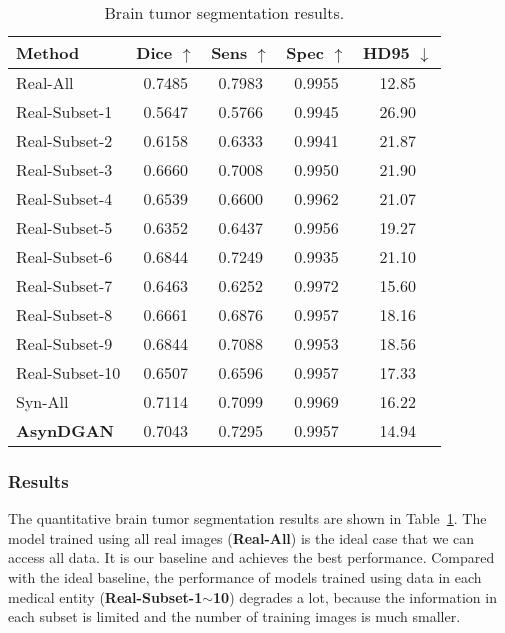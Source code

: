 \begin{table}[t]
	\begin{center}
		\begin{tabular}{lcccc}
			\toprule
			Method & Dice $\uparrow$ & Sens $\uparrow$  & Spec $\uparrow$  & HD95 $\downarrow$ \\
			\midrule
			Real-All & 0.7485 & 0.7983	& 0.9955 & 12.85 \\ \midrule
			Real-Subset-1 & 0.5647 &	0.5766 &	0.9945 &	26.90 \\
			Real-Subset-2 & 0.6158 &	0.6333 &	0.9941 &	21.87 \\
			Real-Subset-3 & 0.6660 &	0.7008 &	0.9950 &	21.90 \\
			Real-Subset-4 & 0.6539 &	0.6600 &	0.9962 &	21.07 \\
			Real-Subset-5 & 0.6352 &	0.6437 &	0.9956 &	19.27 \\
			Real-Subset-6 & 0.6844 &	0.7249 &	0.9935 &	21.10 \\
			Real-Subset-7 & 0.6463 &	0.6252 &	0.9972 &	15.60 \\
			Real-Subset-8 & 0.6661 &	0.6876 &	0.9957 &	18.16 \\
			Real-Subset-9 & 0.6844 &	0.7088 &	0.9953 &	18.56 \\
			Real-Subset-10 & 0.6507 &	0.6596 &	0.9957 &	17.33 \\ \midrule
			Syn-All & 0.7114 &	0.7099 &	0.9969 &	16.22 \\ \midrule
			\textbf{AsynDGAN}  & 0.7043 &	0.7295 &	0.9957 &	14.94 \\
			\bottomrule
		\end{tabular}
	\end{center}
	\caption{Brain tumor segmentation results.}	
	\label{tab:hgg}
	\vspace{-1em}
\end{table}

\subsubsection{Results}
The quantitative brain tumor segmentation results are shown in Table~\ref{tab:hgg}. The model trained using all real images (\textbf{Real-All}) is the ideal case that we can access all data. It is our baseline and achieves the best performance. Compared with the ideal baseline, the performance of models trained using data in each medical entity (\textbf{Real-Subset-1$\sim$10}) degrades a lot, because the information in each subset is limited and the number of training images is much smaller.

